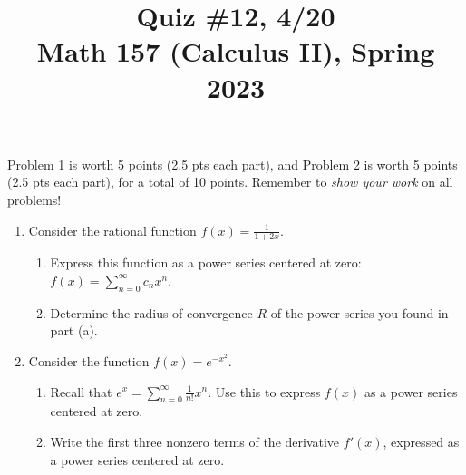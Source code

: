\documentclass[11pt]{article}
\title{Quiz \#12, 4/20\\ Math 157 (Calculus II), Spring 2023}
\date{}
\begin{document}
\maketitle

\thispagestyle{empty}

\vspace{-2cm}

Problem 1 is worth 5 points (2.5 pts each part), and Problem 2 is worth 5 points (2.5 pts each part), for a total of 10 points. Remember to \emph{show your work} on all problems!

\begin{enumerate}

\item Consider the rational function $f(x) = \displaystyle \frac{1}{1+2x}$.
\begin{enumerate}
\item Express this function as a power series centered at zero: $f(x) = \displaystyle \sum_{n=0}^{\infty} c_n x^n$.
\item Determine the radius of convergence $R$ of the power series you found in part (a).
\end{enumerate}

\vspace{2.5in}

\item Consider the function $f(x) = e^{-x^2}$.
\begin{enumerate}
\item Recall that $e^{x} = \sum_{n=0}^{\infty} \frac{1}{n!} x^n$. Use this to express $f(x)$ as a power series centered at zero.
\item Write the first three nonzero terms of the derivative $f'(x)$, expressed as a power series centered at zero.
\end{enumerate}

\end{enumerate}
\end{document}
